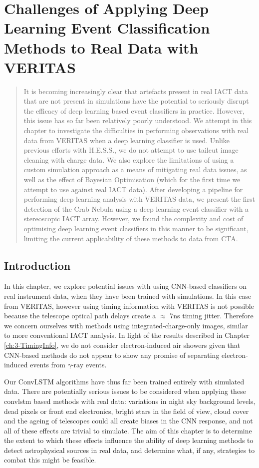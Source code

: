 \chapter{\label{ch:4-VERITASRealData} Challenges of Applying Deep Learning Event Classification Methods to Real Data with VERITAS}
\minitoc
\begin{abstract}
    It is becoming increasingly clear that artefacts present in real IACT data that are not present in simulations have the potential to seriously disrupt the efficacy of deep learning based event classifiers in practice. However, this issue has so far been relatively poorly understood. We attempt in this chapter to investigate the difficulties in performing observations with real data from VERITAS when a deep learning classifier is used. Unlike previous efforts with H.E.S.S., we do not attempt to use tailcut image cleaning with charge data. We also explore the limitations of using a custom simulation approach as a means of mitigating real data issues, as well as the effect of Bayesian Optimisation (which for the first time we attempt to use against real IACT data). After developing a pipeline for performing deep learning analysis with VERITAS data, we present the first detection of the Crab Nebula using a deep learning event classifier with a stereoscopic IACT array. However, we found the complexity and cost of optimising deep learning event classifiers in this manner to be significant, limiting the current applicability of these methods to data from CTA.
\end{abstract}

\section{Introduction}

In this chapter, we explore potential issues with using CNN-based classifiers on real instrument data, when they have been trained with simulations. In this case from VERITAS, however using timing information with VERITAS is not possible because the telescope optical path delays create a $\approx$ 7ns timing jitter. Therefore we concern ourselves with methods using integrated-charge-only images, similar to more conventional IACT analysis. In light of the results described in Chapter \ref{ch:3-TimingInfo}, we do not consider electron-induced air showers given that CNN-based methods do not appear to show any promise of separating electron-induced events from $\gamma$-ray events.

Our ConvLSTM algorithms have thus far been trained entirely with simulated data.  There are potentially serious issues to be considered when applying these convlstm based methods with real data: variations in night sky background levels, dead pixels or front end electronics, bright stars in the field of view, cloud cover and the ageing of telescopes could all create biases in the CNN response, and not all of these effects are trivial to simulate. The aim of this chapter is to determine the extent to which these effects influence the ability of deep learning methods to detect astrophysical sources in real data, and determine what, if any, strategies to combat this might be feasible. 


